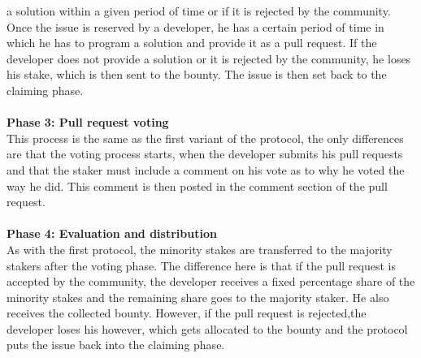 \documentclass[sigconf]{acmart}
\begin{document}
a solution within a given period of time or if it is rejected by the community. Once the issue is reserved by a developer, 
he has a certain period of time in which he has to program a solution and provide it as a pull request. If the developer does not 
provide a solution or it is rejected by the community, he loses his stake, which is then sent to the bounty. The issue is then set back 
to the claiming phase. \\ \\
\textbf{Phase 3: Pull request voting} \\
This process is the same as the first variant of the protocol, the only differences are that the voting process starts, when 
the developer submits his pull requests and that the staker must include a comment on his 
vote as to why he voted the way he did. This comment is then posted in the comment section of the pull request. \\ \\
\textbf{Phase 4: Evaluation and distribution} \\
As with the first protocol, the minority stakes are transferred to the majority stakers after the voting phase. The difference 
here is that if the pull request is accepted by the community, the developer receives a fixed percentage share of the minority
stakes and the remaining share goes to the majority staker. He also receives the collected bounty. However, if the pull request 
is rejected,the developer loses his however, which gets allocated to the bounty and the protocol puts the issue back
 into the claiming phase.
\end{document}
